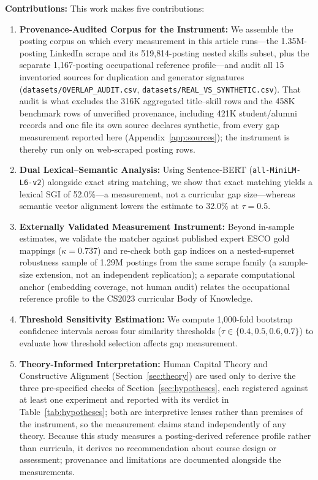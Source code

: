 \documentclass[journal]{IEEEtran}
\begin{document}
\textbf{Contributions:} This work makes five contributions:
\begin{enumerate}
    \item \textbf{Provenance-Audited Corpus for the Instrument:} We assemble the posting corpus on which every measurement in this article runs---the 1.35M-posting LinkedIn scrape and its 519{,}814-posting nested skills subset, plus the separate 1{,}167-posting occupational reference profile---and audit all 15 inventoried sources for duplication and generator signatures (\texttt{datasets/OVERLAP\_AUDIT.csv}, \texttt{datasets/REAL\_VS\_SYNTHETIC.csv}). That audit is what excludes the 316K aggregated title--skill rows and the 458K benchmark rows of unverified provenance, including 421K student/alumni records and one file its own source declares synthetic, from every gap measurement reported here (Appendix~\ref{app:sources}); the instrument is thereby run only on web-scraped posting rows.
    \item \textbf{Dual Lexical--Semantic Analysis:} Using Sentence-BERT (\texttt{all-MiniLM-L6-v2}) alongside exact string matching, we show that exact matching yields a lexical SGI of 52.0\%---a measurement, not a curricular gap size---whereas semantic vector alignment lowers the estimate to 32.0\% at $\tau = 0.5$.
    \item \textbf{Externally Validated Measurement Instrument:} Beyond in-sample estimates, we validate the matcher against published expert ESCO gold mappings ($\kappa = 0.737$) and re-check both gap indices on a nested-superset robustness sample of 1.29M postings from the same scrape family (a sample-size extension, not an independent replication); a separate computational anchor (embedding coverage, not human audit) relates the occupational reference profile to the CS2023 curricular Body of Knowledge.
    \item \textbf{Threshold Sensitivity Estimation:} We compute 1,000-fold bootstrap confidence intervals across four similarity thresholds ($\tau \in \{0.4, 0.5, 0.6, 0.7\}$) to evaluate how threshold selection affects gap measurement.
    \item \textbf{Theory-Informed Interpretation:} Human Capital Theory and Constructive Alignment (Section~\ref{sec:theory}) are used only to derive the three pre-specified checks of Section~\ref{sec:hypotheses}, each registered against at least one experiment and reported with its verdict in Table~\ref{tab:hypotheses}; both are interpretive lenses rather than premises of the instrument, so the measurement claims stand independently of any theory. Because this study measures a posting-derived reference profile rather than curricula, it derives no recommendation about course design or assessment; provenance and limitations are documented alongside the measurements.
\end{enumerate}
\end{document}

